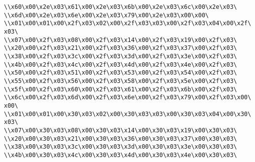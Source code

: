 \verb|\\x60\x00\x2e\x03\x61\x00\x2e\x03\x6b\x00\x2e\x03\x6c\x00\x2e\x03\|\newline
\verb|\\x6d\x00\x2e\x03\x6e\x00\x2e\x03\x79\x00\x2e\x03\x00\x00\|\newline
\verb|\\x01\x00\x01\x00\x2f\x03\x02\x00\x2f\x03\x03\x00\x2f\x03\x04\x00\x2f\x03\|\newline
\verb|\\x07\x00\x2f\x03\x08\x00\x2f\x03\x14\x00\x2f\x03\x19\x00\x2f\x03\|\newline
\verb|\\x20\x00\x2f\x03\x21\x00\x2f\x03\x36\x00\x2f\x03\x37\x00\x2f\x03\|\newline
\verb|\\x38\x00\x2f\x03\x3c\x00\x2f\x03\x3d\x00\x2f\x03\x3e\x00\x2f\x03\|\newline
\verb|\\x4b\x00\x2f\x03\x4c\x00\x2f\x03\x4d\x00\x2f\x03\x4e\x00\x2f\x03\|\newline
\verb|\\x50\x00\x2f\x03\x51\x00\x2f\x03\x53\x00\x2f\x03\x54\x00\x2f\x03\|\newline
\verb|\\x55\x00\x2f\x03\x56\x00\x2f\x03\x58\x00\x2f\x03\x5e\x00\x2f\x03\|\newline
\verb|\\x5f\x00\x2f\x03\x60\x00\x2f\x03\x61\x00\x2f\x03\x6b\x00\x2f\x03\|\newline
\verb|\\x6c\x00\x2f\x03\x6d\x00\x2f\x03\x6e\x00\x2f\x03\x79\x00\x2f\x03\x00\x00\|\newline
\verb|\\x01\x00\x01\x00\x30\x03\x02\x00\x30\x03\x03\x00\x30\x03\x04\x00\x30\x03\|\newline
\verb|\\x07\x00\x30\x03\x08\x00\x30\x03\x14\x00\x30\x03\x19\x00\x30\x03\|\newline
\verb|\\x20\x00\x30\x03\x21\x00\x30\x03\x36\x00\x30\x03\x37\x00\x30\x03\|\newline
\verb|\\x38\x00\x30\x03\x3c\x00\x30\x03\x3d\x00\x30\x03\x3e\x00\x30\x03\|\newline
\verb|\\x4b\x00\x30\x03\x4c\x00\x30\x03\x4d\x00\x30\x03\x4e\x00\x30\x03\|\newline
